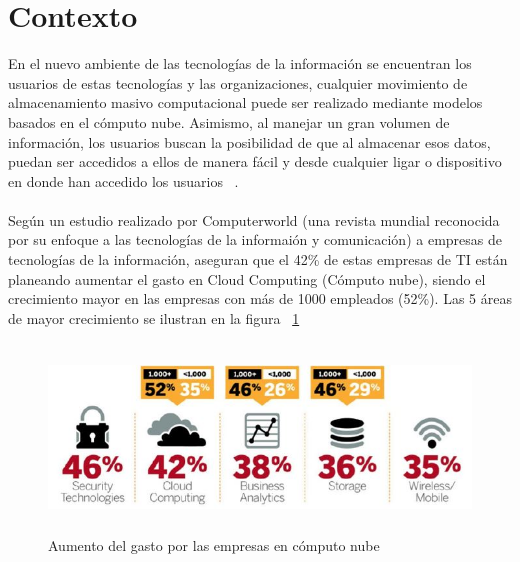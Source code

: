 
\section{Contexto}

En el nuevo ambiente de las tecnologías de la información se encuentran los usuarios de estas tecnologías y las organizaciones, cualquier movimiento de almacenamiento masivo computacional puede ser realizado mediante modelos  basados en el cómputo nube. Asimismo, al manejar un gran volumen de información, los usuarios buscan la posibilidad de que al almacenar esos datos, puedan ser accedidos a ellos de manera fácil y desde cualquier ligar o dispositivo en donde han accedido los usuarios ~\cite{Nubei}. \\ \\ 

Según un estudio realizado por Computerworld (una revista mundial reconocida por su enfoque a las tecnologías de la informaión y comunicación) a empresas de tecnologías de la información, aseguran que el 42\% de estas empresas de TI están planeando aumentar el gasto en Cloud Computing (Cómputo nube), siendo el crecimiento mayor en las empresas con más de 1000 empleados (52\%). Las 5 áreas de mayor crecimiento se ilustran en la figura ~\ref{fig:1-1-1}

\begin{figure}[H]
\centering
	\includegraphics[width=15cm, height=5cm]{./images/aumentoCloudComputing.jpg}
	\caption{Aumento del gasto por las empresas en cómputo nube}
	\label{fig:1-1-1}
\end{figure}


